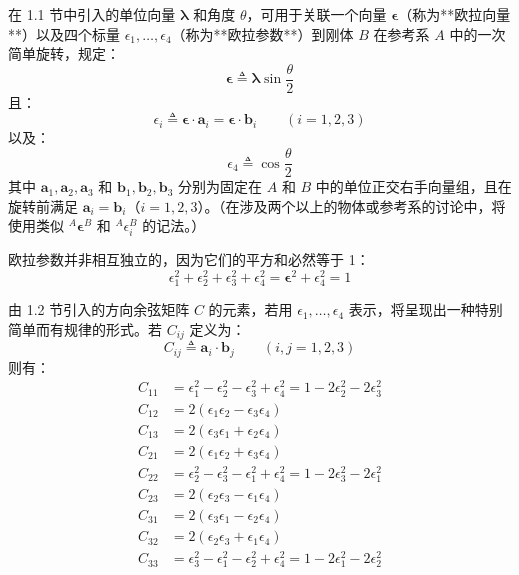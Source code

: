 在 1.1 节中引入的单位向量 \(\boldsymbol{\lambda}\) 和角度 \(\theta\)，可用于关联一个向量 \(\boldsymbol{\epsilon}\)（称为**欧拉向量**）以及四个标量 \(\epsilon_1, \dots, \epsilon_4\)（称为**欧拉参数**）到刚体 \(B\) 在参考系 \(A\) 中的一次简单旋转，规定：
\begin{equation}
\boldsymbol{\epsilon} \triangleq \boldsymbol{\lambda} \sin\frac{\theta}{2} \tag{1}
\end{equation}
且：
\begin{equation}
\epsilon_i \triangleq \boldsymbol{\epsilon} \cdot \mathbf{a}_i = \boldsymbol{\epsilon} \cdot \mathbf{b}_i \qquad (i = 1, 2, 3) \tag{2}
\end{equation}
以及：
\begin{equation}
\epsilon_4 \triangleq \cos\frac{\theta}{2} \tag{3}
\end{equation}
其中 \(\mathbf{a}_1, \mathbf{a}_2, \mathbf{a}_3\) 和 \(\mathbf{b}_1, \mathbf{b}_2, \mathbf{b}_3\) 分别为固定在 \(A\) 和 \(B\) 中的单位正交右手向量组，且在旋转前满足 \(\mathbf{a}_i = \mathbf{b}_i\)（\(i=1,2,3\)）。（在涉及两个以上的物体或参考系的讨论中，将使用类似 \({}^A \boldsymbol{\epsilon}^B\) 和 \({}^A\epsilon_i^B\) 的记法。）

欧拉参数并非相互独立的，因为它们的平方和必然等于 1：
\begin{equation}
\epsilon_1^2 + \epsilon_2^2 + \epsilon_3^2 + \epsilon_4^2 = \boldsymbol{\epsilon}^2 + \epsilon_4^2 = 1 \tag{4}
\end{equation}

由 1.2 节引入的方向余弦矩阵 \(C\) 的元素，若用 \(\epsilon_1, \dots, \epsilon_4\) 表示，将呈现出一种特别简单而有规律的形式。若 \(C_{ij}\) 定义为：
\begin{equation}
C_{ij} \triangleq \mathbf{a}_i \cdot \mathbf{b}_j \qquad (i, j = 1, 2, 3) \tag{5}
\end{equation}
则有：
\begin{align}
C_{11} &= \epsilon_1^2 - \epsilon_2^2 - \epsilon_3^2 + \epsilon_4^2 = 1 - 2\epsilon_2^2 - 2\epsilon_3^2 \tag{6} \\
C_{12} &= 2(\epsilon_1 \epsilon_2 - \epsilon_3 \epsilon_4) \tag{7} \\
C_{13} &= 2(\epsilon_3 \epsilon_1 + \epsilon_2 \epsilon_4) \tag{8} \\
C_{21} &= 2(\epsilon_1 \epsilon_2 + \epsilon_3 \epsilon_4) \tag{9} \\
C_{22} &= \epsilon_2^2 - \epsilon_3^2 - \epsilon_1^2 + \epsilon_4^2 = 1 - 2\epsilon_3^2 - 2\epsilon_1^2 \tag{10} \\
C_{23} &= 2(\epsilon_2 \epsilon_3 - \epsilon_1 \epsilon_4) \tag{11} \\
C_{31} &= 2(\epsilon_3 \epsilon_1 - \epsilon_2 \epsilon_4) \tag{12} \\
C_{32} &= 2(\epsilon_2 \epsilon_3 + \epsilon_1 \epsilon_4) \tag{13} \\
C_{33} &= \epsilon_3^2 - \epsilon_1^2 - \epsilon_2^2 + \epsilon_4^2 = 1 - 2\epsilon_1^2 - 2\epsilon_2^2 \tag{14}
\end{align}

